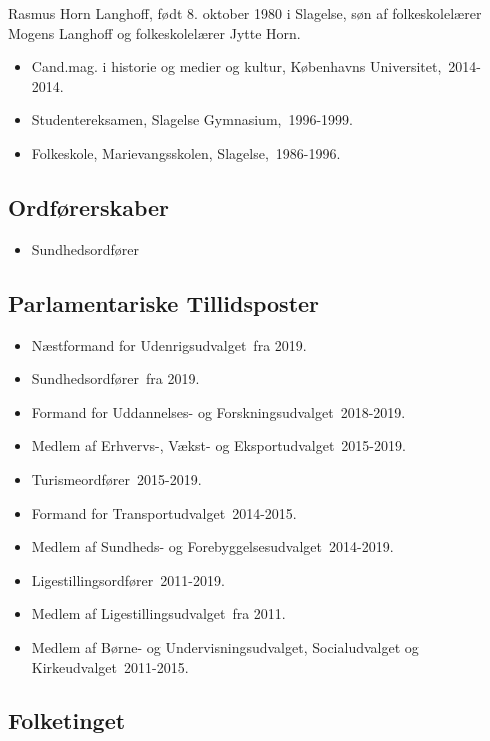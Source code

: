 \documentclass[11pt, a4paper]{awesome-cv}
\begin{document}
\makecvheader[R]
\makelettertitle
\begin{cvletter}
Rasmus Horn Langhoff, født 8. oktober 1980 i Slagelse, søn af folkeskolelærer Mogens Langhoff og folkeskolelærer Jytte Horn.

\begin{itemize}
\item Cand.mag. i historie og medier og kultur, Københavns Universitet, 2014-2014.
\item Studentereksamen, Slagelse Gymnasium, 1996-1999.
\item Folkeskole, Marievangsskolen, Slagelse, 1986-1996.
\end{itemize}
\subsection*{Ordførerskaber}
\begin{itemize}
\item Sundhedsordfører
\end{itemize}
\subsection*{Parlamentariske Tillidsposter}
\begin{itemize}
\item Næstformand for Udenrigsudvalget fra 2019.
\item Sundhedsordfører fra 2019.
\item Formand for Uddannelses- og Forskningsudvalget 2018-2019.
\item Medlem af Erhvervs-, Vækst- og Eksportudvalget 2015-2019.
\item Turismeordfører 2015-2019.
\item Formand for Transportudvalget 2014-2015.
\item Medlem af Sundheds- og Forebyggelsesudvalget 2014-2019.
\item Ligestillingsordfører 2011-2019.
\item Medlem af Ligestillingsudvalget fra 2011.
\item Medlem af Børne- og Undervisningsudvalget, Socialudvalget og Kirkeudvalget 2011-2015.
\end{itemize}
\subsection*{Folketinget}

\end{cvletter}
\end{document}
